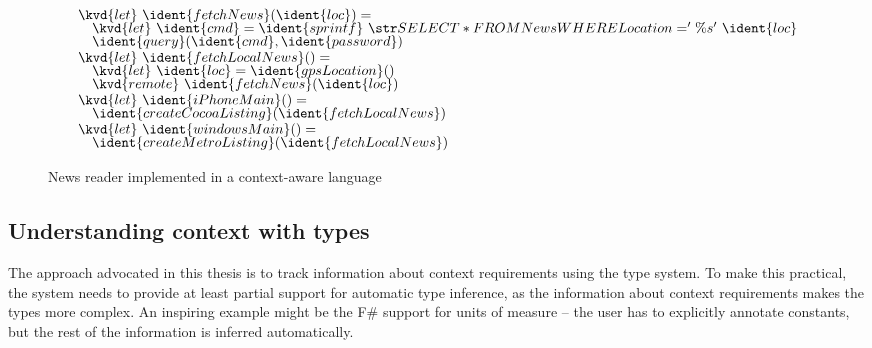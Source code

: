 \begin{figure}
\begin{equation*}
\begin{array}{l}
\kvd{let}~\ident{fetchNews}(\ident{loc}) =\\[-0.25em]
\hspace{1em} \kvd{let}~\ident{cmd} = \ident{sprintf}~\str{SELECT * FROM News WHERE Location='\%s'}~\ident{loc}\\[-0.25em]
\hspace{1em} \ident{query}(\ident{cmd}, \ident{password})\\[-0.25em]
\\[-1.0em]
\kvd{let}~\ident{fetchLocalNews}() =\\[-0.25em]
\hspace{1em} \kvd{let}~\ident{loc} = \ident{gpsLocation}()\\[-0.25em]
\hspace{1em} \kvd{remote}~\ident{fetchNews}(\ident{loc})\\[-0.25em]
\\[-1.0em]
\kvd{let}~\ident{iPhoneMain}() = \\[-0.25em]
\hspace{1em} \ident{createCocoaListing}(\ident{fetchLocalNews})\\[-0.25em]
\\[-1.0em]
\kvd{let}~\ident{windowsMain}() = \\[-0.25em]
\hspace{1em} \ident{createMetroListing}(\ident{fetchLocalNews})
\end{array}
\end{equation*}

\vspace{1em}
\noindent\makebox[\linewidth]{\rule{\textwidth}{0.5pt}} 
\vspace{-1.5em}
\caption{News reader implemented in a context-aware language}
\label{fig:introduction-sample}
\end{figure}


\subsection{Understanding context with types}

The approach advocated in this thesis is to track information about context requirements using
the type system. To make this practical, the system needs to provide at least partial support for 
automatic type inference, as the information about context requirements makes the types more complex.
An inspiring example might be the F\# support for units of measure \cite{app-units} -- the user has
to explicitly annotate constants, but the rest of the information is inferred automatically.

